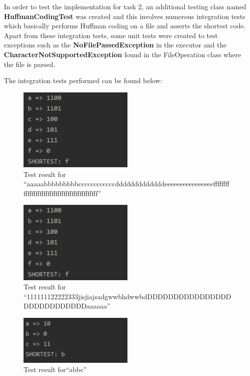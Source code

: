 \documentclass{article}
\newcommand{\quotes}[1]{``#1''}
\begin{document}
In order to test the implementation for task 2, an additional testing class named \textbf{HuffmanCodingTest} was created and this involves numerous integration tests which basically performs Huffman coding on a file and asserts the shortest code. Apart from these integration tests, some unit tests  were created to test exceptions such as the \textbf{NoFilePassedException} in the executor and the \textbf{CharacterNotSupportedException} found in the FileOperation class where the file is parsed.

The integration tests performed can be found below:

				\begin{figure}[H]
					\centering
			 			\includegraphics[width=0.5\textwidth]{hctest1.png}
			 			\centering
			  			\caption{Test result for \quotes{aaaaabbbbbbbbbccccccccccccdddddddddddddeeeeeeeeeeeeeeeefffffffffffffffffffffffffffffffffffffffffffff}}
			  			\label{fig:dplltest1}
					\end{figure}
					
				\begin{figure}[H]
					\centering
			 			\includegraphics[width=0.5\textwidth]{hctest1.png}
			 			\centering
			  			\caption{Test result for \quotes{111111122222333jisjiajsadgwwbhdwwbdDDDDDDDDDDDDDDDDDDDDDDDDDDDDaaaaaa}}
			  			\label{fig:hctest1}
					\end{figure}
				

				\begin{figure}[H]
					\centering
			 			\includegraphics[width=0.5\textwidth]{hctest4.png}
			 			\centering
			  			\caption{Test result for\quotes{abbc}}
			  			\label{fig:hctest4}
					\end{figure}
					
\end{document}
